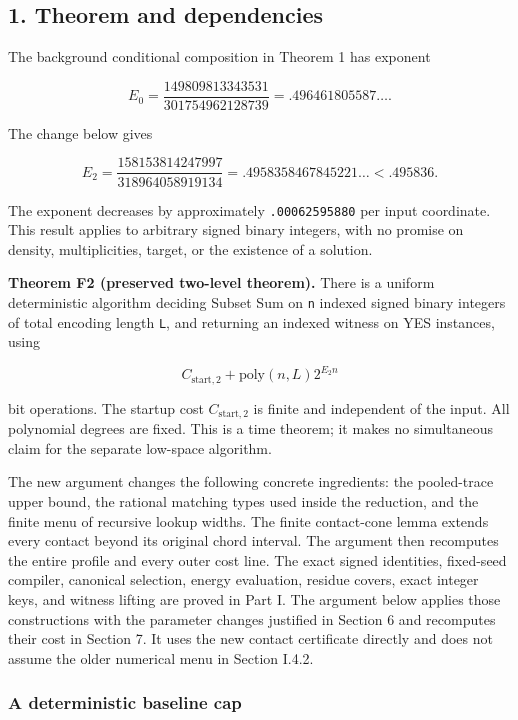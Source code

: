 \hypertarget{af-a9ec399514-theorem-and-dependencies}{%
\subsection{1. Theorem and dependencies}\label{af-a9ec399514-theorem-and-dependencies}}

The background conditional composition in Theorem 1 has exponent

\[
E_0=\frac{149809813343531}{301754962128739}
 =.496461805587\ldots.
\]

The change below gives

\[
\boxed{E_2=
 \frac{158153814247997}{318964058919134}
 =.4958358467845221\ldots < .495836.}
 \tag{XSS1}
\]

The exponent decreases by approximately \texttt{.00062595880} per input coordinate. This result applies to arbitrary signed binary integers, with no promise on density, multiplicities, target, or the existence of a solution.

\textbf{Theorem F2 (preserved two-level theorem).} There is a uniform deterministic algorithm deciding Subset Sum on \texttt{n} indexed signed binary integers of total encoding length \texttt{L}, and returning an indexed witness on YES instances, using

\[
C_{\mathrm{start},2}+\mathrm{poly}(n,L)2^{E_2n}
 \tag{XSS2}
\]

bit operations. The startup cost \(C_{\mathrm{start},2}\) is finite and independent of the input. All polynomial degrees are fixed. This is a time theorem; it makes no simultaneous claim for the separate low-space algorithm.

The new argument changes the following concrete ingredients: the pooled-trace upper bound, the rational matching types used inside the reduction, and the finite menu of recursive lookup widths. The finite contact-cone lemma extends every contact beyond its original chord interval. The argument then recomputes the entire profile and every outer cost line. The exact signed identities, fixed-seed compiler, canonical selection, energy evaluation, residue covers, exact integer keys, and witness lifting are proved in Part I. The argument below applies those constructions with the parameter changes justified in Section 6 and recomputes their cost in Section 7. It uses the new contact certificate directly and does not assume the older numerical menu in Section I.4.2.

\hypertarget{af-a9ec399514-a-deterministic-baseline-cap}{%
\subsubsection{A deterministic baseline cap}\label{af-a9ec399514-a-deterministic-baseline-cap}}

